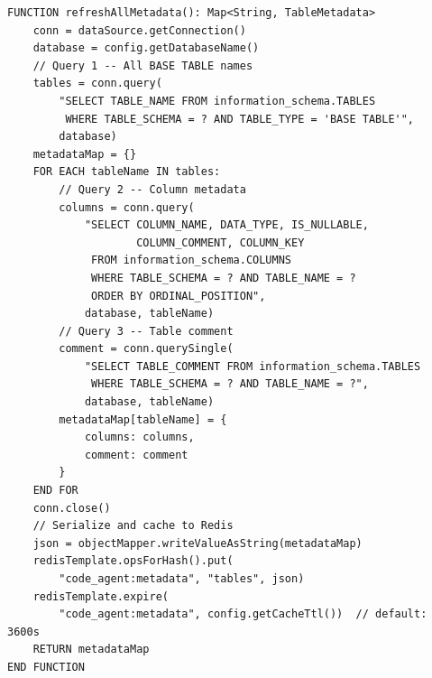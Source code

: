 \begin{table}[H]
\small\singlespacing
\centering
\caption{Pseudocode --- refreshAllMetadata() Schema Metadata Cache Loading}
\label{tab:pseudocode-refresh-metadata}
\vspace{2mm}

\begin{lstlisting}
FUNCTION refreshAllMetadata(): Map<String, TableMetadata>
    conn = dataSource.getConnection()
    database = config.getDatabaseName()
    // Query 1 -- All BASE TABLE names
    tables = conn.query(
        "SELECT TABLE_NAME FROM information_schema.TABLES
         WHERE TABLE_SCHEMA = ? AND TABLE_TYPE = 'BASE TABLE'",
        database)
    metadataMap = {}
    FOR EACH tableName IN tables:
        // Query 2 -- Column metadata
        columns = conn.query(
            "SELECT COLUMN_NAME, DATA_TYPE, IS_NULLABLE,
                    COLUMN_COMMENT, COLUMN_KEY
             FROM information_schema.COLUMNS
             WHERE TABLE_SCHEMA = ? AND TABLE_NAME = ?
             ORDER BY ORDINAL_POSITION",
            database, tableName)
        // Query 3 -- Table comment
        comment = conn.querySingle(
            "SELECT TABLE_COMMENT FROM information_schema.TABLES
             WHERE TABLE_SCHEMA = ? AND TABLE_NAME = ?",
            database, tableName)
        metadataMap[tableName] = {
            columns: columns,
            comment: comment
        }
    END FOR
    conn.close()
    // Serialize and cache to Redis
    json = objectMapper.writeValueAsString(metadataMap)
    redisTemplate.opsForHash().put(
        "code_agent:metadata", "tables", json)
    redisTemplate.expire(
        "code_agent:metadata", config.getCacheTtl())  // default: 3600s
    RETURN metadataMap
END FUNCTION
\end{lstlisting}
\end{table}


\vspace{3mm}


